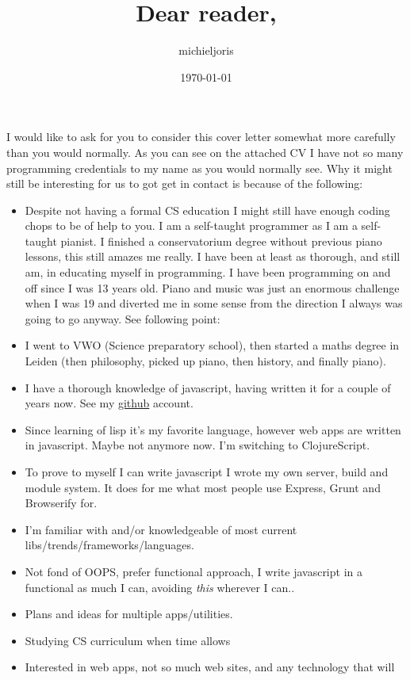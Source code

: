\documentclass[11pt]{article}
\title{Dear reader,}
\author{michieljoris}
\date{\today}
\begin{document}
\maketitle


I would like to ask for you to consider this cover letter somewhat more
carefully than you would normally. As you can see on the attached CV I have not
so many programming credentials to my name as you would normally see. Why it
might still be interesting for us to got get in contact is because of the
following:

\begin{itemize}
\item Despite not having a formal CS education I might still have enough coding
  chops to be of help to you. I am a self-taught programmer as I am a
  self-taught pianist. I finished a conservatorium degree without previous piano
  lessons, this still amazes me really. I have been at least as thorough, and
  still am, in educating myself in programming. I have been programming on and
  off since I was 13 years old. Piano and music was just an enormous challenge
  when I was 19 and diverted me in some sense from the direction I always was
  going to go anyway. See following point:
\item I went to VWO (Science preparatory school), then started a maths degree in
  Leiden (then philosophy, picked up piano, then history, and finally piano).
\item I have a thorough knowledge of javascript, having written it for a couple of
  years now. See my \href{http://github.com/michieljoris}{github} account.
\item Since learning of lisp it's my favorite language, however web apps are written
  in javascript. Maybe not anymore now. I'm switching to ClojureScript.
\item To prove to myself I can write javascript I wrote my own server, build and
  module system. It does for me what most people use Express, Grunt and
  Browserify for.
\item I'm familiar with and/or knowledgeable of most current
  libs/trends/frameworks/languages.
\item Not fond of OOPS, prefer functional approach, I write javascript in a
  functional as much I can, avoiding \emph{this} wherever I can..
\item Plans and ideas for multiple apps/utilities.
\item Studying CS curriculum when time allows
\item Interested in web apps, not so much web sites, and any technology that will

\end{itemize}
\end{document}
